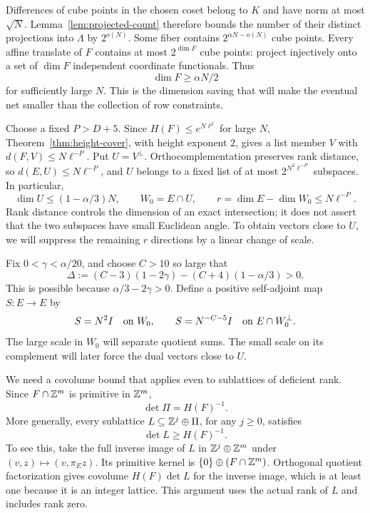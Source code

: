 Differences of cube points in the chosen coset belong to $K$ and have
norm at most $\sqrt N$.  Lemma~\ref{lem:projected-count} therefore
bounds the number of their distinct projections into $\Lambda$ by
$2^{o(N)}$.  Some fiber contains $2^{\alpha N-o(N)}$ cube points.
Every affine translate of $F$ contains at most $2^{\dim F}$ cube
points: project injectively onto a set of $\dim F$ independent
coordinate functionals.  Thus
\begin{equation}\label{eq:lattice-large-fiber}
 \dim F\ge\alpha N/2
\end{equation}
for sufficiently large $N$.  This is the dimension saving that will
make the eventual net smaller than the collection of row constraints.

Choose a fixed $P>D+5$.  Since $H(F)\le e^{N\ell^2}$ for large $N$,
Theorem~\ref{thm:height-cover}, with height exponent $2$, gives a
list member $V$ with $d(F,V)\le N\ell^{-P}$.  Put $U=V^\perp$.
Orthocomplementation preserves rank distance, so
$d(E,U)\le N\ell^{-P}$, and $U$ belongs to a fixed list of at most
$2^{N^2\ell^{-P}}$ subspaces.  In particular,
\begin{equation}\label{eq:lattice-cover-dimension}
 \dim U\le(1-\alpha/3)N,
 \qquad W_0=E\cap U,
 \qquad r=\dim E-\dim W_0\le N\ell^{-P}.
\end{equation}
Rank distance controls the dimension of an exact intersection; it
does not assert that the two subspaces have small Euclidean angle.
To obtain vectors close to $U$, we will suppress the remaining $r$
directions by a linear change of scale.

Fix $0<\gamma<\alpha/20$, and choose $C>10$ so large that
\begin{equation}\label{eq:lattice-entropy-margin}
 \Delta:=(C-3)(1-2\gamma)-(C+4)(1-\alpha/3)>0.
\end{equation}
This is possible because $\alpha/3-2\gamma>0$.
Define a positive self-adjoint map $S:E\to E$ by
\begin{equation}\label{eq:lattice-scale}
 S=N^2 I\quad\hbox{on }W_0,
 \qquad
 S=N^{-C-5}I\quad\hbox{on }E\cap W_0^\perp.
\end{equation}
The large scale in $W_0$ will separate quotient sums.  The small scale
on its complement will later force the dual vectors close to $U$.

We need a covolume bound that applies even to sublattices of deficient
rank.  Since $F\cap\mathbb Z^m$ is primitive in $\mathbb Z^m$,
\begin{equation}\label{eq:lattice-projection-covolume}
 \det\Pi=H(F)^{-1}.
\end{equation}
More generally, every sublattice $L\subseteq\mathbb Z^j\oplus\Pi$, for any
$j\ge0$, satisfies
\begin{equation}\label{eq:lattice-lift-bound}
 \det L\ge H(F)^{-1}.
\end{equation}
To see this, take the full inverse image of $L$ in
$\mathbb Z^j\oplus\mathbb Z^m$ under $(v,z)\mapsto(v,\pi_Ez)$.  Its primitive
kernel is $\{0\}\oplus(F\cap\mathbb Z^m)$.  Orthogonal quotient factorization
gives covolume $H(F)\det L$ for the inverse image, which is at least
one because it is an integer lattice.  This argument uses the actual
rank of $L$ and includes rank zero.

